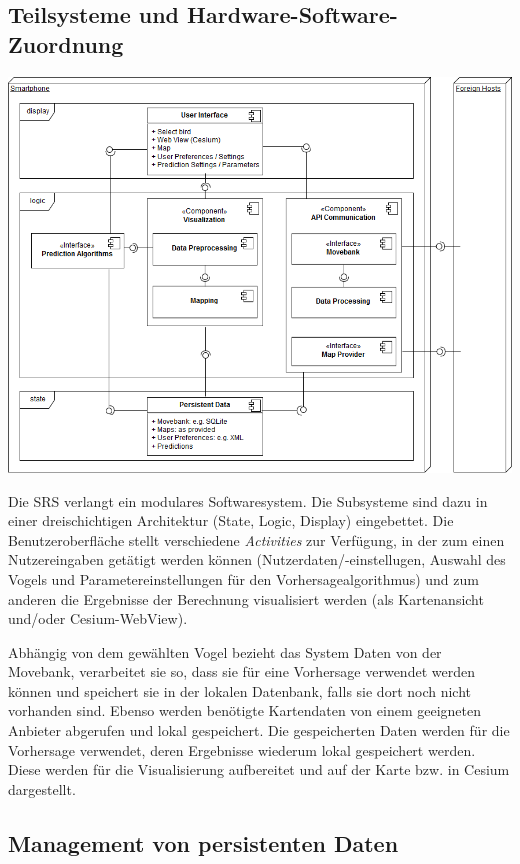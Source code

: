 \documentclass[12pt]{article} %
\begin{document}
\subsection{Teilsysteme und Hardware-Software-Zuordnung}

\includegraphics[width = \textwidth]{Diagramme/ComponentDiagram.png}

\vspace{1em}

Die SRS verlangt ein modulares Softwaresystem. Die Subsysteme sind dazu in einer dreischichtigen Architektur (State, Logic, Display) eingebettet. Die Benutzeroberfläche stellt verschiedene \textit{Activities} zur Verfügung, in der zum einen Nutzereingaben getätigt werden können (Nutzerdaten/-einstellugen, Auswahl des Vogels und Parametereinstellungen für den Vorhersagealgorithmus) und zum anderen die Ergebnisse der Berechnung visualisiert werden (als Kartenansicht und/oder Cesium-WebView).

Abhängig von dem gewählten Vogel bezieht das System Daten von der Movebank, verarbeitet sie so, dass sie für eine Vorhersage verwendet werden können und speichert sie in der lokalen Datenbank, falls sie dort noch nicht vorhanden sind. Ebenso werden benötigte Kartendaten von einem geeigneten Anbieter abgerufen und lokal gespeichert. Die gespeicherten Daten werden für die Vorhersage verwendet, deren Ergebnisse wiederum lokal gespeichert werden. Diese werden für die Visualisierung aufbereitet und auf der Karte bzw. in Cesium dargestellt.

\subsection{Management von persistenten Daten}
\end{document}
